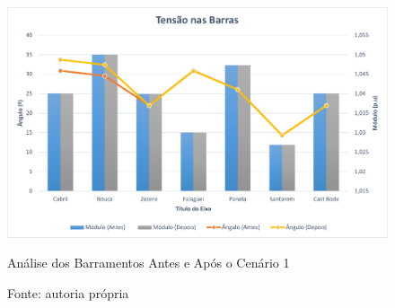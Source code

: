 \begin{figure}[H]
	\centering
	\captionsetup{width=\textwidth, font=footnotesize, textfont=bf}	
	\includegraphics[width=\linewidth]{img/tensoes_barras_caso1.pdf}
	\caption{Análise dos Barramentos Antes e Após o Cenário 1}
	\vspace{-3.5mm}
	\caption*{Fonte: autoria própria}
	\label{fig:tensoes_barras_caso1}
\end{figure}
